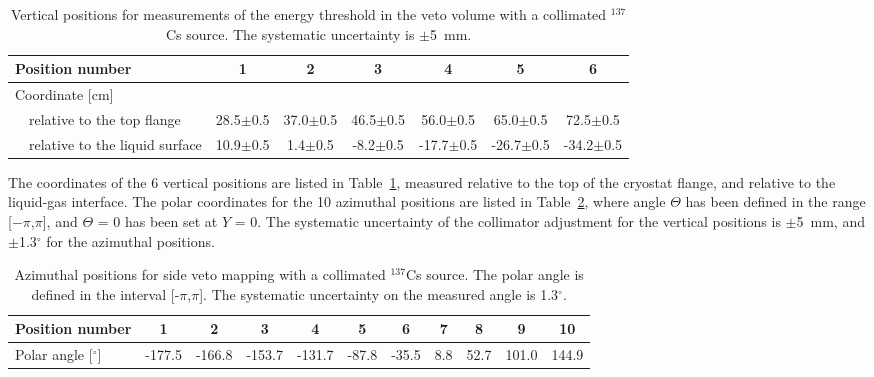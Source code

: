\begin{table}[!b]
\centering
\caption[Vertical positions for measurements of the energy threshold in the veto volume with a collimated $^{137}$Cs source]{Vertical positions for measurements of the energy threshold in the veto volume with a collimated $^{137}$Cs source. The systematic uncertainty is $\pm$5~mm.}
\label{tabVetoCoordinatesVertical}
\begin{tabular}{>{\footnotesize}l|>{\footnotesize}c|>{\footnotesize}c|>{\footnotesize}c|>{\footnotesize}c|>{\footnotesize}c|>{\footnotesize}c}
\hline
\footnotesize{Position number}			& 1 				& 2				& 3				& 4 	 			& 5				& 6 \\
\hline
Coordinate [cm] & & & & & & \\
\ \ relative to the top flange	      		& 28.5$\pm$0.5	& 37.0$\pm$0.5 	& 46.5$\pm$0.5	& 56.0$\pm$0.5 	& 65.0$\pm$0.5	& 72.5$\pm$0.5 \\
\ \ relative to the liquid surface		& 10.9$\pm$0.5	& 1.4$\pm$0.5 		& -8.2$\pm$0.5		& -17.7$\pm$0.5 	& -26.7$\pm$0.5	& -34.2$\pm$0.5 \\
\hline
\end{tabular}
\end{table}

The coordinates of the 6 vertical positions are listed in Table~\ref{tabVetoCoordinatesVertical}, measured relative to the top of the cryostat flange, and relative to the liquid-gas interface. The polar coordinates for the 10 azimuthal positions are listed in Table~\ref{tabVetoCoordinatesAzimuthal}, where angle $\Theta$ has been defined in the range [$-\pi$,$\pi$], and $\Theta$ = 0 has been set at $Y$ = 0. The systematic uncertainty of the collimator adjustment for the vertical positions is $\pm$5~mm, and $\pm$1.3$^{\circ}$ for the azimuthal positions.

\begin{table}[!h]
\centering
\caption[Azimuthal positions for side veto mapping with a collimated $^{137}$Cs source]{Azimuthal positions for side veto mapping with a collimated $^{137}$Cs source. The polar angle is defined in the interval [-$\pi$,$\pi$]. The systematic uncertainty on the measured angle is 1.3$^{\circ}$. }
\label{tabVetoCoordinatesAzimuthal}
\begin{tabular}{>{\footnotesize}l|>{\footnotesize}c|>{\footnotesize}c|>{\footnotesize}c|>{\footnotesize}c|>{\footnotesize}c|>{\footnotesize}c|>{\footnotesize}c|>{\footnotesize}c|>{\footnotesize}c|>{\footnotesize}c}
\hline
\footnotesize{Position number}		& 1 		& 2		& 3		& 4 	 	& 5		& 6		& 7		& 8		& 9		& 10 \\
\hline
Polar angle [$^{\circ}$]	      	& -177.5	& -166.8 	& -153.7	& -131.7 	& -87.8	& -35.5 	& 8.8		& 52.7	& 101.0	& 144.9 \\
\hline
\end{tabular}
\end{table}

